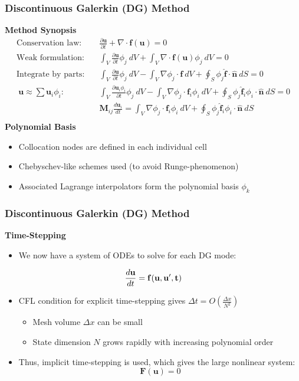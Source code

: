 \documentclass[9pt]{beamer}
\newcommand{\bv}[1]{\mathbf{#1}}
\newcommand{\diff}[2]{\frac{\partial #1}{\partial #2}}
\newcommand{\beqq}[0]{\begin{equation*}}
\newcommand{\eeqq}[0]{\end{equation*}}
\begin{document}
\begin{frame}
\frametitle{Discontinuous Galerkin (DG) Method}
\label{sec-4-9}

\textbf{Method Synopsis}
\beqq
\begin{aligned}
\text{Conservation law:}\quad & \diff{\bv{u}}{t} + \nabla \cdot \bv{f}(\bv{u}) = 0 \\
\text{Weak formulation:}\quad & \int_V \diff{\bv{u}}{t} \phi_j \ dV + \int_V  \nabla \cdot \bv{f}(\bv{u})\phi_j\ dV = 0 \\
\text{Integrate by parts:}\quad & \int_V \diff{\bv{u}}{t} \phi_j\ dV - \int_V \nabla \phi_j \cdot \bv{f}\ dV + \oint_S \phi_j \bv{\hat{f}} \cdot \bv{\hat{n}}\ dS = 0 \\
\ \bv{u}\approx \sum \bv{u}_i \phi_i\text{:}\quad & \int_V \diff{\bv{u}_i \phi_i}{t} \phi_j\ dV - \int_V \nabla \phi_j \cdot \bv{f}_i \phi_i\ dV + \oint_S \phi_j \bv{\hat{f}}_i \phi_i \cdot \bv{\hat{n}}\ dS = 0 \\
\text{}\quad & \bv{M}_{ij} \frac{d\bv{u}_i}{dt} = \int_V \nabla \phi_j \cdot \bv{f}_i \phi_i\ dV + \oint_S \phi_j \bv{\hat{f}}_i \phi_i \cdot \bv{\hat{n}}\ dS \\
\end{aligned}
\eeqq
\textbf{Polynomial Basis}
\begin{itemize}
\item Collocation nodes are defined in each individual cell
\item Chebyschev-like schemes used (to avoid Runge-phenomenon)
\item Associated Lagrange interpolators form the polynomial basis ${\phi_k}$
\end{itemize}
\end{frame}
\begin{frame}
\frametitle{Discontinuous Galerkin (DG) Method}
\label{sec-4-10}

\textbf{Time-Stepping}
\begin{itemize}
\item We now have a system of ODEs to solve for each DG mode:
\end{itemize}
$$\frac{d\bv{u}}{dt} = \bf{f}(\bf{u,u',t})$$
\begin{itemize}
\item CFL condition for explicit time-stepping gives $\Delta t = O(\frac{\Delta x}{N^2})$
\begin{itemize}
\item Mesh volume $\Delta x$ can be small
\item State dimension $N$ grows rapidly with increasing polynomial order
\end{itemize}
\item Thus, implicit time-stepping is used, which gives the large nonlinear system:
  $$\bv{F}(\bv{u}) = 0$$
\end{itemize}
\end{frame}
\end{document}
